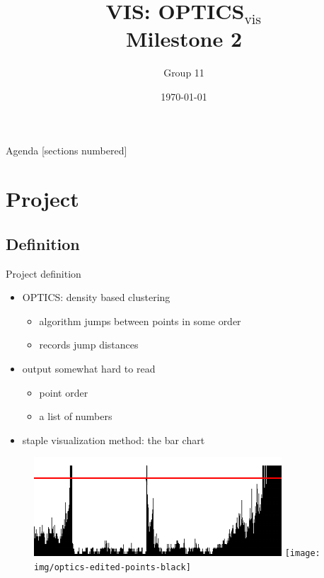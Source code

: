 \documentclass[naustrian]{beamer}
\title{VIS: OPTICS$_\text{vis}$\\Milestone 2}
\date{\today}
\author{Group 11}
\institute{Fakultät für Informatik}
\begin{document}
\maketitle

\begin{frame}{Agenda}
    [sections numbered]
    \tableofcontents
\end{frame}

\section{Project}

\subsection{Definition}

\begin{frame}{Project definition}
    \begin{itemize}
        \item OPTICS: density based clustering
            \begin{itemize}
                \item algorithm jumps between points in some order
                \item records jump distances
            \end{itemize}
        \item output somewhat hard to read
            \begin{itemize}
                \item point order
                \item a list of numbers
            \end{itemize}
        \item staple visualization method: the bar chart
    \end{itemize}
    \begin{figure}[h]
        \centering
        \includegraphics[height=.3\textheight]{img/optics-edited}
        \vspace{1em}
        \texttt{[image: img/optics-edited-points-black]}
    \end{figure}
\end{frame}
\end{document}
